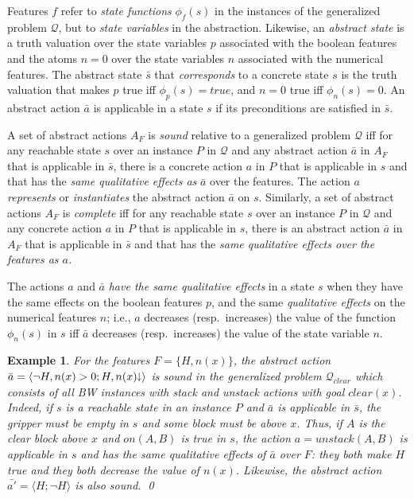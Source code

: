 \documentclass[letterpaper]{article} %
\newcommand{\tup}[1]{\langle #1 \rangle}
\newtheorem{example}[definition]{Example}
\newcommand{\Q}{\mathcal{Q}}
\newcommand{\abst}[2]{\tup{#1;#2}}
\newcommand{\mminus}{\hspace{-.05em}\raisebox{.15ex}{\footnotesize$\downarrow$}}
\begin{document}
Features $f$ refer to \emph{state functions} $\phi_f(s)$ in the instances
of the generalized problem $\Q$, but to \emph{state variables} in the
abstraction. Likewise, an \emph{abstract state} is  a truth valuation over
the state variables $p$ associated with the boolean features and the atoms
$n=0$ over the state variables $n$ associated with the numerical features.
The abstract state $\bar{s}$ that \emph{corresponds} to a concrete state $s$
is the truth valuation that makes $p$ true iff $\phi_p(s)=true$, and $n=0$
true iff $\phi_n(s) = 0$. An abstract action $\bar{a}$ is applicable in
a state $s$ if its preconditions are satisfied in $\bar{s}$.

A set of abstract actions $A_F$ is \emph{sound} relative to a generalized
problem $\Q$ iff for any reachable state $s$ over an instance $P$ in $\Q$
and any abstract action $\bar{a}$ in $A_F$ that is applicable in $\bar{s}$,
there is a concrete action $a$ in $P$ that is applicable in $s$ and that
has the \emph{same qualitative effects as} $\bar{a}$ over the features.
The action $a$ \emph{represents} or \emph{instantiates} the abstract action
$\bar{a}$ on $s$. 
%
Similarly, a set of abstract actions $A_F$ is \emph{complete} iff for any
reachable state $s$ over an instance $P$ in $\Q$ and any concrete action $a$
in $P$ that is applicable in $s$, there is an abstract action $\bar{a}$ in
$A_F$ that is applicable in $\bar{s}$ and that has the \emph{same qualitative
effects over the features as $a$.}

The actions $a$ and $\bar{a}$ \emph{have the same qualitative effects} in
a state $s$ when they have the same effects on the boolean features $p$,
and the same \emph{qualitative effects} on the numerical features $n$; i.e.,
$a$ decreases (resp.\ increases) the value of the function $\phi_n(s)$ in
$s$ iff $\bar{a}$ decreases (resp.\ increases) the value of the state
variable  $n$.

\begin{example}
  For the features $F=\{H,n(x)\}$, the abstract action $\bar{a}=\abst{\neg H,n(x)>0}{H,n(x)\mminus}$ 
  is sound in the generalized problem $\Q_{clear}$ which consists of all
  BW instances with stack and unstack actions with goal $clear(x)$.
  Indeed, if $s$ is a reachable state in an instance $P$ and $\bar{a}$ is
  applicable in $\bar{s}$, the gripper must be empty in $s$ and some
  block must be above $x$. Thus, if $A$ is the clear block above $x$ and
  $on(A,B)$ is true in $s$, the action $a=unstack(A,B)$ is applicable in
  $s$ and has the same qualitative effects of $\bar{a}$ over $F$: they
  both make $H$ true and they both decrease the value of $n(x)$.
  Likewise, the abstract action $\bar{a'}=\abst{H}{\neg H}$ is also sound. \qed
\end{example}
\end{document}
